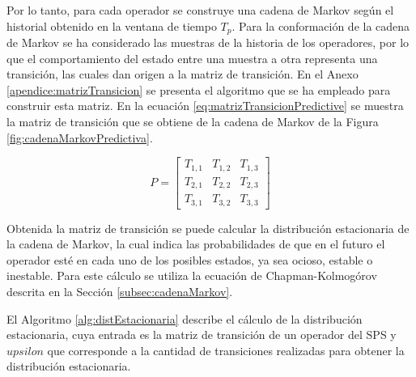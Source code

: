 
Por lo tanto, para cada operador se construye una cadena de Markov seg\'un el historial obtenido en la ventana de tiempo $T_p$. Para la conformaci\'on de la cadena de Markov se ha considerado las muestras de la historia de los operadores, por lo que el comportamiento del estado entre una muestra a otra representa una transici\'on, las cuales dan origen a la matriz de transici\'on. En el Anexo \ref{apendice:matrizTransicion} se presenta el algoritmo que se ha empleado para construir esta matriz. En la ecuaci\'on \ref{eq:matrizTransicionPredictive} se muestra la matriz de transici\'on que se obtiene de la cadena de Markov de la Figura \ref{fig:cadenaMarkovPredictiva}.

\begin{equation} \label{eq:matrizTransicionPredictive}
	P =
	\begin{bmatrix}
		T_{1,1} & T_{1,2} & T_{1,3} \\
		T_{2,1} & T_{2,2} & T_{2,3} \\
		T_{3,1} & T_{3,2} & T_{3,3}
	\end{bmatrix}	
\end{equation}

Obtenida la matriz de transici\'on se puede calcular la distribuci\'on estacionaria de la cadena de Markov, la cual indica las probabilidades de que en el futuro el operador est\'e en cada uno de los posibles estados, ya sea ocioso, estable o inestable. Para este c\'alculo se utiliza la ecuaci\'on de Chapman-Kolmog\'orov \citep{Papoulis1984} descrita en la Secci\'on \ref{subsec:cadenaMarkov}.

El Algoritmo \ref{alg:distEstacionaria} describe el c\'alculo de la distribuci\'on estacionaria, cuya entrada es la matriz de transici\'on de un operador del SPS y $upsilon$ que corresponde a la cantidad de transiciones realizadas para obtener la distribuci\'on estacionaria. 

